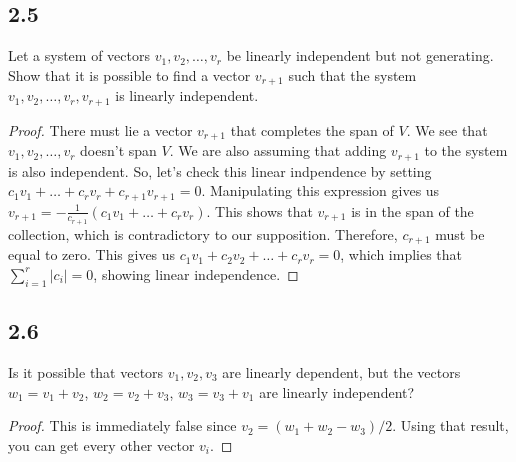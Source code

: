 \documentclass{amsart}
\begin{document}
\subsection*{2.5} Let a system of vectors $v_1,v_2, \ldots, v_r$ be linearly independent but not generating. Show that it is possible to find a vector $v_{r+1}$ such that the system $v_1, v_2, \ldots, v_r, v_{r+1}$ is linearly independent. 
\begin{proof}
There must lie a vector $v_{r+1}$ that completes the span of $V$. We see that $v_1,v_2, \ldots, v_r$ doesn't span $V$. We are also assuming that adding $v_{r+1}$ to the system is also independent. So, let's check this linear indpendence by setting $c_1v_1+\ldots+c_rv_r+c_{r+1}v_{r+1}=0$. Manipulating this expression gives us $v_{r+1} = -\frac{1}{c_{r+1}}(c_1v_1 + \ldots + c_rv_r)$. This shows that $v_{r+1}$ is in the span of the collection, which is contradictory to our supposition. Therefore, $c_{r+1}$ must be equal to zero. This gives us $c_1v_1+c_2v_2+ \ldots+ c_rv_r = 0$, which implies that $\sum_{i=1}^{r}|c_i|=0$, showing linear independence. 
\end{proof}
\subsection*{2.6} Is it possible that vectors $v_1,v_2,v_3$ are linearly dependent, but the vectors $w_1 = v_1+v_2$, $w_2 = v_2+v_3$, $w_3 = v_3 +v_1$ are linearly independent? 
\begin{proof}
    This is immediately false since $v_2 = (w_1 + w_2 - w_3)/2$. Using that result, you can get every other vector $v_i$. 
\end{proof}
\end{document}
